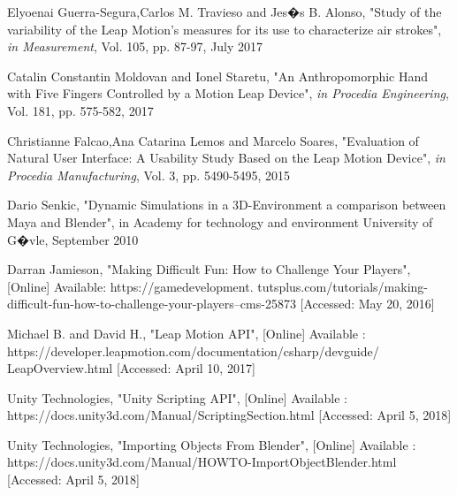 \documentclass[journal]{IEEEtran}										    %
\begin{document}
        
        \begin{thebibliography}{1}

                Elyoenai Guerra-Segura,Carlos M. Travieso and Jes�s B. Alonso, "Study of the 
                variability of the Leap Motion's measures for its use to characterize air strokes", 
                \emph{in Measurement}, Vol. 105, pp. 87-97, July 2017
                
                
                Catalin Constantin Moldovan and Ionel Staretu, "An Anthropomorphic Hand with Five 
                Fingers Controlled by a Motion Leap Device", \emph{in Procedia Engineering}, Vol. 181, 
                pp. 575-582, 2017
                

                Christianne Falcao,Ana Catarina Lemos and Marcelo Soares, "Evaluation of Natural User 
                Interface: A Usability Study Based on the Leap Motion Device", 
                \emph{in Procedia Manufacturing}, Vol. 3, pp. 5490-5495, 2015
            
                Dario Senkic, "Dynamic Simulations in a 3D-Environment a comparison between Maya
                and Blender", in Academy for technology and environment University of G�vle, 
                September 2010

                Darran Jamieson, "Making Difficult Fun: How to Challenge Your Players", [Online]
                Available: https://gamedevelopment.
                tutsplus.com/tutorials/making-difficult-fun-how-to-challenge-your-players--cms-25873 [Accessed: May 20, 2016]
            
                Michael B. and David H., "Leap Motion API", [Online] Available :
                https://developer.leapmotion.com/documentation/csharp/devguide/ \\
                Leap\textunderscore Overview.html 
                [Accessed: April 10, 2017]

                Unity Technologies, "Unity Scripting API", [Online] Available :
                https://docs.unity3d.com/Manual/ScriptingSection.html [Accessed: April 5, 2018]
            
                Unity Technologies, "Importing Objects From Blender", [Online] Available : 
                https://docs.unity3d.com/Manual/HOWTO-ImportObjectBlender.html [Accessed: April 5, 2018]


\end{thebibliography}
\end{document}
